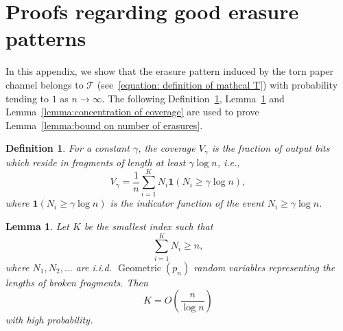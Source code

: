 \documentclass[journal,letterpaper,onecolumn,11pt]{IEEEtran}
\newtheorem{lemma}{Lemma}
\newtheorem{definition}{Definition}
\begin{document}
\section{Proofs regarding good erasure patterns}\label{appendix for good sets}
In this appendix, we show that the erasure pattern induced
by the torn paper channel belongs to $\mathcal{T}$ (see~\eqref{equation: definition of mathcal T}) with probability tending to $1$ as $n \to \infty$.
The following Definition~\ref{Definition: coverage of fragment}, Lemma~\ref{lemma:number of fragments} and Lemma~\ref{lemma:concentration of coverage} are used to prove Lemma~\ref{lemma:bound on number of erasures}.
\begin{definition}\label{Definition: coverage of fragment}\cite[Definition~1]{shomorony2021torn}
    For a constant $\gamma$, the \textit{coverage} $V_\gamma$ is the fraction of output bits which reside in fragments of length at least $\gamma\log n$, i.e.,
    \begin{equation*}
        V_\gamma=\frac{1}{n}\sum_{i=1}^{K}N_i\mathbf{1}({N_i\geq \gamma\log n }),
    \end{equation*}
    where $\mathbf{1}({N_i\geq \gamma\log n })$ is the indicator function of the event $N_i\geq \gamma\log n $.
\end{definition}
\begin{lemma}\label{lemma:number of fragments}
 Let $K$ be the smallest index such that
\[
    \sum_{i=1}^{K} N_i \ge n,
\]
where $N_1,N_2,\ldots$ are i.i.d. $\operatorname{Geometric}(p_n)$ random variables representing the lengths of broken fragments. Then
\[
    K = O\!\left(\frac{n}{\log n}\right)
\]
with high probability.
\end{lemma}
\end{document}
